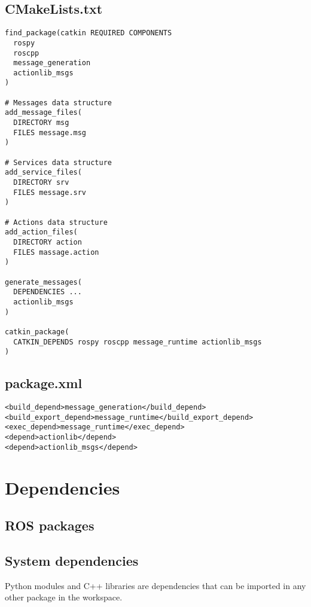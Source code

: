         \subsection{CMakeLists.txt}
\begin{verbatim}
find_package(catkin REQUIRED COMPONENTS
  rospy
  roscpp
  message_generation
  actionlib_msgs
)

# Messages data structure
add_message_files(
  DIRECTORY msg
  FILES message.msg
)

# Services data structure
add_service_files(
  DIRECTORY srv
  FILES message.srv
)

# Actions data structure
add_action_files(
  DIRECTORY action 
  FILES massage.action
)

generate_messages(
  DEPENDENCIES ...
  actionlib_msgs
)

catkin_package(
  CATKIN_DEPENDS rospy roscpp message_runtime actionlib_msgs
)
\end{verbatim}


        \subsection{package.xml}
\begin{verbatim}
<build_depend>message_generation</build_depend>
<build_export_depend>message_runtime</build_export_depend>
<exec_depend>message_runtime</exec_depend>
<depend>actionlib</depend>
<depend>actionlib_msgs</depend>
\end{verbatim}








\section{Dependencies}
    

  \subsection{ROS packages}


  
  \subsection{System dependencies}
  Python modules and C++ libraries are dependencies that can be imported in any other package in the workspace.


